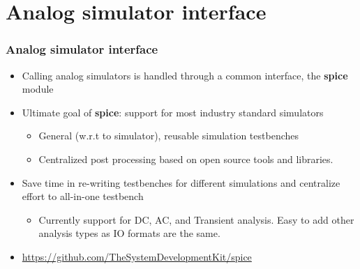 \documentclass{sdkslides}
\newcommand{\sectname}{Section Name}
\begin{document}
\renewcommand{\sectname}{Analog simulator interface}
\section{\sectname}
\begin{frame}[t]
    \frametitle{\sectname}
    \begin{itemize}
        \item Calling analog simulators is handled through a common interface, the \textbf{spice} module
        \item Ultimate goal of \textbf{spice}: support for most industry standard simulators
        \begin{itemize}
            \item General (w.r.t to simulator), reusable simulation testbenches
            \item Centralized post processing based on open source tools and
                libraries.
        \end{itemize}
            \item Save time in re-writing testbenches for different simulations and centralize effort to all-in-one testbench
        \begin{itemize}
        \item Currently support for DC, AC, and Transient analysis. Easy to
            add other analysis types as IO formats are the same. 
        \end{itemize}
        \item \url{https://github.com/TheSystemDevelopmentKit/spice}
    \end{itemize}
\end{frame}

\renewcommand{\sectname}{Digital simulator interface}
\end{document}
